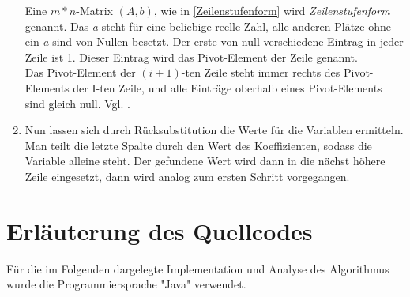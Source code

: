 \documentclass[a4paper, 12pt]{report}
\begin{document}
\begin{enumerate}
        Eine $ m * n $-Matrix $(A,b)$, wie in \ref{Zeilenstufenform} wird  \textit{Zeilenstufenform} genannt.
        Das \textit{a} steht für eine beliebige reelle Zahl, alle anderen Plätze ohne ein \textit{a} sind von Nullen besetzt.
        Der erste von null verschiedene Eintrag in jeder Zeile ist 1. Dieser Eintrag wird das Pivot-Element der Zeile genannt. \\
        Das Pivot-Element der $(i + 1)$-ten Zeile steht immer rechts des Pivot-Elements der I-ten Zeile, und alle Einträge
        oberhalb eines Pivot-Elements sind gleich null. Vgl. \cite{5}.
    \item Nun lassen sich durch Rücksubstitution die Werte für die Variablen ermitteln.
        Man teilt die letzte Spalte durch den Wert des Koeffizienten, sodass die Variable alleine steht.
        Der gefundene Wert wird dann in die nächst höhere Zeile eingesetzt, dann wird analog zum ersten Schritt vorgegangen.
\end{enumerate}

{\let\clearpage\relax \chapter{Erläuterung des Quellcodes}}
Für die im Folgenden dargelegte Implementation und Analyse des Algorithmus wurde die Programmiersprache "Java" verwendet.
\end{document}
